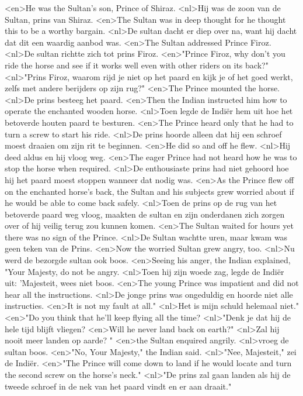 <en>He was the Sultan's son, Prince of Shiraz.
<nl>Hij was de zoon van de Sultan, prins van Shiraz.
<en>The Sultan was in deep thought for he thought this to be a worthy bargain.
<nl>De sultan dacht  er diep over na, want hij dacht dat dit een waardig aanbod was.
<en>The Sultan addressed Prince Firoz.
<nl>De sultan richtte zich tot prins Firoz.
<en>"Prince Firoz, why don't you ride the horse and see if it works well even with other riders on its back?"
<nl>"Prins Firoz, waarom rijd je niet op het paard en kijk je of het goed werkt, zelfs met andere berijders op zijn rug?"
<en>The Prince mounted the horse.
<nl>De prins besteeg het paard.
<en>Then the Indian instructed him how to operate the enchanted wooden horse.
<nl>Toen legde de Indi\"er  hem uit hoe  het betoverde houten paard te besturen.
<en>The Prince heard only that he had to turn a screw to start his ride.
<nl>De prins hoorde alleen dat hij een schroef moest draaien om zijn rit te beginnen.
<en>He did so and off he flew.
<nl>Hij deed aldus en hij vloog weg.
<en>The eager Prince had not heard how he was to stop the horse when required.
<nl>De enthousiaste prins had niet gehoord hoe hij het paard moest stoppen wanneer dat nodig was.
<en>As the Prince flew off on the enchanted horse's back, the Sultan and his subjects grew worried about if he would be able to come back safely.
<nl>Toen de prins op de rug van het betoverde paard weg vloog, maakten de sultan en zijn onderdanen zich zorgen over of hij veilig terug zou kunnen komen.
<en>The Sultan waited for hours yet there was no sign of the Prince.
<nl>De Sultan wachtte uren, maar kwam was geen teken van de Prins.
<en>Now the worried Sultan grew angry, too.
<nl>Nu werd de bezorgde sultan ook boos.
<en>Seeing his anger, the Indian explained, "Your Majesty, do not be angry.
<nl>Toen hij zijn woede zag, legde de Indi\"er uit: 'Majesteit, wees niet boos.
<en>The young Prince was impatient and did not hear all the instructions.
<nl>De jonge prins was ongeduldig en hoorde niet alle instructies.
<en>It is not my fault at all."
<nl>Het is mijn schuld helemaal niet."
<en>"Do you think that he'll keep flying all the time?
<nl>"Denk je dat hij de hele tijd blijft vliegen?
<en>Will he never land back on earth?"
<nl>Zal hij nooit meer landen op aarde? "
<en>the Sultan enquired angrily.
<nl>vroeg de sultan boos.
<en>"No, Your Majesty," the Indian said.
<nl>"Nee, Majesteit," zei de Indi\"er.
<en>"The Prince will come down to land if he would locate and turn the second screw on the horse's neck."
<nl>"De prins zal gaan landen als hij   de tweede schroef in de nek van het paard vindt en er aan draait."
